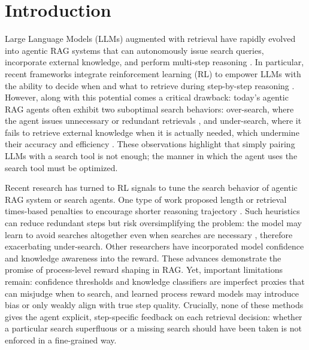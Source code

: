 \documentclass{article}
\begin{document}
\section{Introduction}
\label{sec:introduction}
Large Language Models (LLMs) augmented with retrieval have rapidly evolved into agentic RAG systems that can autonomously issue search queries, incorporate external knowledge, and perform multi-step reasoning .
In particular, recent frameworks integrate reinforcement learning (RL) to empower LLMs with the ability to decide when and what to retrieve during step-by-step reasoning .
However, along with this potential comes a critical drawback: today’s agentic RAG agents often exhibit two suboptimal search behaviors:
over-search, where the agent issues unnecessary or redundant retrievals , and under-search, where it fails to retrieve external knowledge when it is actually needed, which undermine their accuracy and efficiency . These observations highlight that simply pairing LLMs with a search tool is not enough; the manner in which the agent uses the search tool must be optimized.

Recent research has turned to RL signals to tune the search behavior of agentic RAG system or search agents. One type of work proposed length or retrieval times-based penalties
to encourage shorter reasoning trajectory . Such heuristics can reduce redundant steps but risk oversimplifying the problem: the model may learn to avoid searches altogether even when searches are necessary , therefore exacerbating under-search. Other researchers have incorporated model confidence and knowledge awareness into the reward.
These advances demonstrate the promise of process-level reward shaping in RAG. Yet, important limitations remain: confidence thresholds and knowledge classifiers are imperfect proxies that can misjudge when to search, and learned process reward models may introduce bias or only weakly align with true step quality. Crucially, none of these methods gives the agent explicit, step-specific feedback on each retrieval decision: whether a particular search superfluous or a missing search should have been taken is not enforced in a fine-grained way.
\end{document}
